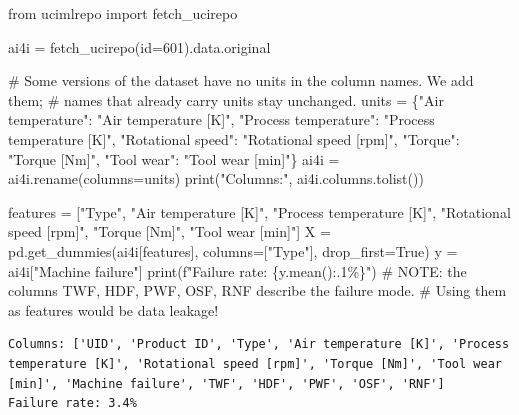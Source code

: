\documentclass[
  letterpaper,
  DIV=11,
  numbers=noendperiod]{scrreprt}
\newenvironment{Shaded}{\begin{snugshade}}{\end{snugshade}}
\newcommand{\AlertTok}[1]{\textcolor[rgb]{0.68,0.00,0.00}{#1}}
\newcommand{\BuiltInTok}[1]{\textcolor[rgb]{0.00,0.23,0.31}{#1}}
\newcommand{\CommentTok}[1]{\textcolor[rgb]{0.37,0.37,0.37}{#1}}
\newcommand{\DecValTok}[1]{\textcolor[rgb]{0.68,0.00,0.00}{#1}}
\newcommand{\ImportTok}[1]{\textcolor[rgb]{0.00,0.46,0.62}{#1}}
\newcommand{\NormalTok}[1]{\textcolor[rgb]{0.00,0.23,0.31}{#1}}
\newcommand{\OperatorTok}[1]{\textcolor[rgb]{0.37,0.37,0.37}{#1}}
\newcommand{\SpecialCharTok}[1]{\textcolor[rgb]{0.37,0.37,0.37}{#1}}
\newcommand{\SpecialStringTok}[1]{\textcolor[rgb]{0.13,0.47,0.30}{#1}}
\newcommand{\StringTok}[1]{\textcolor[rgb]{0.13,0.47,0.30}{#1}}
\newcommand{\VariableTok}[1]{\textcolor[rgb]{0.07,0.07,0.07}{#1}}
\begin{document}
\begin{Shaded}
\begin{Highlighting}[]
\ImportTok{from}\NormalTok{ ucimlrepo }\ImportTok{import}\NormalTok{ fetch\_ucirepo}

\NormalTok{ai4i }\OperatorTok{=}\NormalTok{ fetch\_ucirepo(}\BuiltInTok{id}\OperatorTok{=}\DecValTok{601}\NormalTok{).data.original}

\CommentTok{\# Some versions of the dataset have no units in the column names. We add them;}
\CommentTok{\# names that already carry units stay unchanged.}
\NormalTok{units }\OperatorTok{=}\NormalTok{ \{}\StringTok{"Air temperature"}\NormalTok{: }\StringTok{"Air temperature [K]"}\NormalTok{, }\StringTok{"Process temperature"}\NormalTok{: }\StringTok{"Process temperature [K]"}\NormalTok{,}
         \StringTok{"Rotational speed"}\NormalTok{: }\StringTok{"Rotational speed [rpm]"}\NormalTok{, }\StringTok{"Torque"}\NormalTok{: }\StringTok{"Torque [Nm]"}\NormalTok{, }\StringTok{"Tool wear"}\NormalTok{: }\StringTok{"Tool wear [min]"}\NormalTok{\}}
\NormalTok{ai4i }\OperatorTok{=}\NormalTok{ ai4i.rename(columns}\OperatorTok{=}\NormalTok{units)}
\BuiltInTok{print}\NormalTok{(}\StringTok{"Columns:"}\NormalTok{, ai4i.columns.tolist())}

\NormalTok{features }\OperatorTok{=}\NormalTok{ [}\StringTok{"Type"}\NormalTok{, }\StringTok{"Air temperature [K]"}\NormalTok{, }\StringTok{"Process temperature [K]"}\NormalTok{,}
            \StringTok{"Rotational speed [rpm]"}\NormalTok{, }\StringTok{"Torque [Nm]"}\NormalTok{, }\StringTok{"Tool wear [min]"}\NormalTok{]}
\NormalTok{X }\OperatorTok{=}\NormalTok{ pd.get\_dummies(ai4i[features], columns}\OperatorTok{=}\NormalTok{[}\StringTok{"Type"}\NormalTok{], drop\_first}\OperatorTok{=}\VariableTok{True}\NormalTok{)}
\NormalTok{y }\OperatorTok{=}\NormalTok{ ai4i[}\StringTok{"Machine failure"}\NormalTok{]}
\BuiltInTok{print}\NormalTok{(}\SpecialStringTok{f"Failure rate: }\SpecialCharTok{\{}\NormalTok{y}\SpecialCharTok{.}\NormalTok{mean()}\SpecialCharTok{:.1\%\}}\SpecialStringTok{"}\NormalTok{)}
\CommentTok{\# }\AlertTok{NOTE}\CommentTok{: the columns TWF, HDF, PWF, OSF, RNF describe the failure mode.}
\CommentTok{\# Using them as features would be data leakage!}
\end{Highlighting}
\end{Shaded}

\begin{verbatim}
Columns: ['UID', 'Product ID', 'Type', 'Air temperature [K]', 'Process temperature [K]', 'Rotational speed [rpm]', 'Torque [Nm]', 'Tool wear [min]', 'Machine failure', 'TWF', 'HDF', 'PWF', 'OSF', 'RNF']
Failure rate: 3.4%
\end{verbatim}
\end{document}
